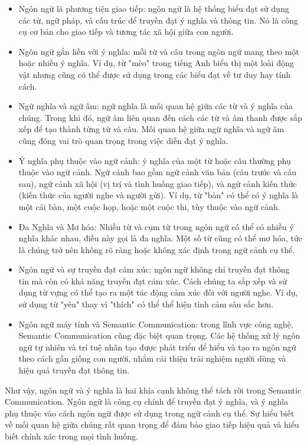 \documentclass{article} %
\begin{document}
\begin{itemize}
    \item Ngôn ngữ là phương tiện giao tiếp: ngôn ngữ là hệ thống biểu đạt sử dụng các từ, ngữ pháp, và cấu trúc để truyền đạt ý nghĩa và thông tin. Nó là công cụ cơ bản cho giao tiếp và tương tác xã hội giữa con người.
\item Ngôn ngữ gắn liền với ý nghĩa: mỗi từ và câu trong ngôn ngữ mang theo một hoặc nhiều ý nghĩa. Ví dụ, từ "mèo" trong tiếng Anh biểu thị một loài động vật nhưng cũng có thể được sử dụng trong các biểu đạt về tư duy hay tính cách. 
\item Ngữ nghĩa và ngữ âm: ngữ nghĩa là mối quan hệ giữa các từ và ý nghĩa của chúng. Trong khi đó, ngữ âm liên quan đến cách các từ và âm thanh được sắp xếp để tạo thành từng từ và câu. Mối quan hệ giữa ngữ nghĩa và ngữ âm cũng đóng vai trò quan trọng trong việc diễn đạt ý nghĩa.
\item Ý nghĩa phụ thuộc vào ngữ cảnh: ý nghĩa của một từ hoặc câu thường phụ thuộc vào ngữ cảnh. Ngữ cảnh bao gồm ngữ cảnh văn bản (câu trước và câu sau), ngữ cảnh xã hội (vị trí và tình huống giao tiếp), và ngữ cảnh kiến thức (kiến thức của người nghe và người gửi). Ví dụ, từ "bàn" có thể có ý nghĩa là một cái bàn, một cuộc họp, hoặc một cuộc thi, tùy thuộc vào ngữ cảnh.
\item Đa Nghĩa và Mơ hóa: Nhiều từ và cụm từ trong ngôn ngữ có thể có nhiều ý nghĩa khác nhau, điều này gọi là đa nghĩa. Một số từ cũng có thể mơ hóa, tức là chúng trở nên không rõ ràng hoặc không xác định trong ngữ cảnh cụ thể.
\item Ngôn ngữ và sự truyền đạt cảm xúc: ngôn ngữ không chỉ truyền đạt thông tin mà còn có khả năng truyền đạt cảm xúc. Cách chúng ta sắp xếp và sử dụng từ vựng có thể tạo ra một tác động cảm xúc đối với người nghe. Ví dụ, sử dụng từ "yêu" thay vì "thích" có thể thể hiện tình cảm sâu sắc hơn.
\item Ngôn ngữ máy tính và Semantic Communication: trong lĩnh vực công nghệ, Semantic Communication cũng đặc biệt quan trọng. Các hệ thống xử lý ngôn ngữ tự nhiên và trí tuệ nhân tạo được phát triển để hiểu và tạo ra ngôn ngữ theo cách gần giống con người, nhằm cải thiện trải nghiệm người dùng và hiệu quả truyền đạt thông tin.
\end{itemize}

Như vậy, ngôn ngữ và ý nghĩa là hai khía cạnh không thể tách rời trong Semantic Communication. Ngôn ngữ là công cụ chính để truyền đạt ý nghĩa, và ý nghĩa phụ thuộc vào cách ngôn ngữ được sử dụng trong ngữ cảnh cụ thể. Sự hiểu biết về mối quan hệ giữa chúng rất quan trọng để đảm bảo giao tiếp hiệu quả và hiểu biết chính xác trong mọi tình huống.
\end{document}
